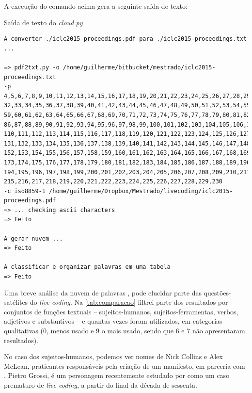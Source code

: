 A execução do comando acima gera a seguinte saída de texto:

\begin{example}{Saída de texto do \emph{cloud.py}}
\begin{verbatim}
A converter ./iclc2015-proceedings.pdf para ./iclc2015-proceedings.txt  ... 

=> pdf2txt.py -o /home/guilherme/bitbucket/mestrado/iclc2015-proceedings.txt 
-p 4,5,6,7,8,9,10,11,12,13,14,15,16,17,18,19,20,21,22,23,24,25,26,27,28,29,30,31,
32,33,34,35,36,37,38,39,40,41,42,43,44,45,46,47,48,49,50,51,52,53,54,55,56,57,58,
59,60,61,62,63,64,65,66,67,68,69,70,71,72,73,74,75,76,77,78,79,80,81,82,83,84,85,
86,87,88,89,90,91,92,93,94,95,96,97,98,99,100,101,102,103,104,105,106,107,108,109,
110,111,112,113,114,115,116,117,118,119,120,121,122,123,124,125,126,127,128,129,130,
131,132,133,134,135,136,137,138,139,140,141,142,143,144,145,146,147,148,149,150,151,
152,153,154,155,156,157,158,159,160,161,162,163,164,165,166,167,168,169,170,171,172,
173,174,175,176,177,178,179,180,181,182,183,184,185,186,187,188,189,190,191,192,193,
194,195,196,197,198,199,200,201,202,203,204,205,206,207,208,209,210,211,212,213,214,
215,216,217,218,219,220,221,222,223,224,225,226,227,228,229,230 
-c iso8859-1 /home/guilherme/Dropbox/Mestrado/livecoding/iclc2015-proceedings.pdf
=> ... checking ascii characters
=> Feito

A gerar nuvem ...
=> Feito

A classificar e organizar palavras em uma tabela
=> Feito
\end{verbatim}
\end{example}

\newpage



Uma breve análise da nuvem de palavras ,  pode elucidar parte das questões-satélites do \emph{live coding}. Na \autoref{tab:comparacao} filtrei parte dos resultados por conjuntos de funções textuais -- sujeitos-humanos, sujeitos-ferramentas, verbos, adjetivos e substantivos -- e quantas vezes foram utilizados, em categorias qualitativas (0, menos usado e 9 o mais usado, sendo que 6 e 7 não apresentaram resultados).

No caso dos sujeitos-humanos, podemos ver nomes de Nick Collins e Alex McLean, praticantes responsáveis pela criação de um manifesto, em parceria com . Pietro Grossi, é um personagem recentemente estudado por  como um caso prematuro de \emph{live coding}, a partir do final da década de sessenta.

